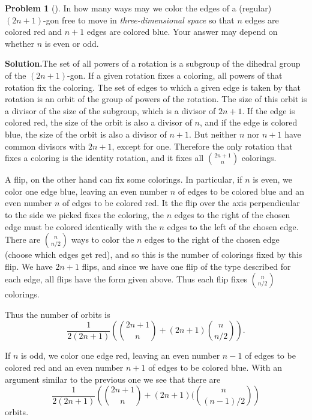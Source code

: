 \documentclass[10pt,]{book}
\theoremstyle{plain}
\theoremstyle{definition}
\newtheorem{activity}[project]{Problem}
\theoremstyle{definition}
\numberwithin{equation}{chapter}
\begin{document}
\begin{activity}[]\label{activity-307}
In how many ways may we color the edges of a (regular) \((2n+1)\)-gon free to move in \emph{three-dimensional space} so that \(n\) edges are colored red and \(n+1\) edges are colored blue. Your answer may depend on whether \(n\) is even or odd.%
\par\medskip\noindent%
\textbf{Solution.}\quad The set of all powers of a rotation is a subgroup of the dihedral group of the \((2n+1)\)-gon. If a given rotation fixes a coloring, all powers of that rotation fix the coloring. The set of edges to which a given edge is taken by that rotation is an orbit of the group of powers of the rotation. The size of this orbit is a divisor of the size of the subgroup, which is a divisor of \(2n+1\). If the edge is colored red, the size of the orbit is also a divisor of \(n\), and if the edge is colored blue, the size of the orbit is also a divisor of \(n+1\). But neither \(n\) nor \(n+1\) have common divisors with \(2n+1\), except for one. Therefore the only rotation that fixes a coloring is the identity rotation, and it fixes all \(\binom{2n+1}{n}\) colorings.%
\par
A flip, on the other hand can fix some colorings. In particular, if \(n\) is even, we color one edge blue, leaving an even number \(n\) of edges to be colored blue and an even number \(n\) of edges to be colored red. It the flip over the axis perpendicular to the side we picked fixes the coloring, the \(n\) edges to the right of the chosen edge must be colored identically with the \(n\) edges to the left of the chosen edge. There are \(\binom{n}{n/2}\) ways to color the \(n\) edges to the right of the chosen edge (choose which edges get red), and so this is the number of colorings fixed by this flip. We have \(2n+1\) flips, and since we have one flip of the type described for each edge, all flips have the form given above. Thus each flip fixes \(\binom{n}{n/2}\) colorings.%
\par
Thus the number of orbits is%
\begin{equation*}
\frac{1}{2(2n+1)}\left(\binom{2n+1}{n} +
(2n+1)\binom{n}{n/2}\right).
\end{equation*}
%
\par
If \(n\) is odd, we color one edge red, leaving an even number \(n-1\) of edges to be colored red and an even number \(n+1\) of edges to be colored blue. With an argument similar to the previous one we see that there are%
\begin{equation*}
\frac{1}{2(2n+1)}\left(\binom{2n+1}{n} + (2n+1)(\binom{n}{(n-1)/2}\right)
\end{equation*}
orbits.%
\end{activity}
\end{document}
